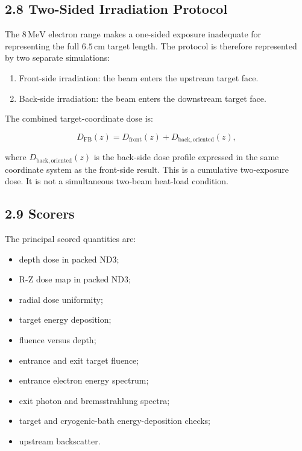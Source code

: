 \documentclass[
  12pt,
]{article}
\providecommand{\tightlist}{%
  \setlength{\itemsep}{0pt}\setlength{\parskip}{0pt}}
\begin{document}
\hypertarget{two-sided-irradiation-protocol}{%
\subsection{2.8 Two-Sided Irradiation
Protocol}\label{two-sided-irradiation-protocol}}

The \(8\,\mathrm{MeV}\) electron range makes a one-sided exposure
inadequate for representing the full \(6.5\,\mathrm{cm}\) target length.
The protocol is therefore represented by two separate simulations:

\begin{enumerate}
\def\labelenumi{\arabic{enumi}.}
\tightlist
\item
  Front-side irradiation: the beam enters the upstream target face.
\item
  Back-side irradiation: the beam enters the downstream target face.
\end{enumerate}

The combined target-coordinate dose is:

\[
D_{\mathrm{FB}}(z) = D_{\mathrm{front}}(z) + D_{\mathrm{back,oriented}}(z),
\]

where \(D_{\mathrm{back,oriented}}(z)\) is the back-side dose profile
expressed in the same coordinate system as the front-side result. This
is a cumulative two-exposure dose. It is not a simultaneous two-beam
heat-load condition.

\hypertarget{scorers}{%
\subsection{2.9 Scorers}\label{scorers}}

The principal scored quantities are:

\begin{itemize}
\tightlist
\item
  depth dose in packed ND3;
\item
  R-Z dose map in packed ND3;
\item
  radial dose uniformity;
\item
  target energy deposition;
\item
  fluence versus depth;
\item
  entrance and exit target fluence;
\item
  entrance electron energy spectrum;
\item
  exit photon and bremsstrahlung spectra;
\item
  target and cryogenic-bath energy-deposition checks;
\item
  upstream backscatter.
\end{itemize}
\end{document}
